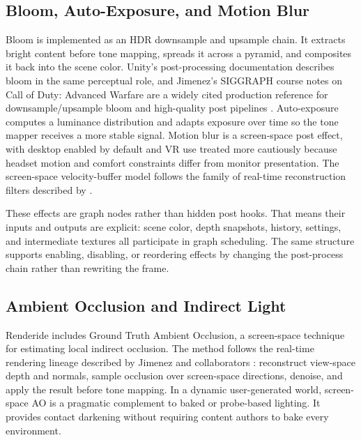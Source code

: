 \documentclass[acmtog,screen,nonacm]{acmart}
\begin{document}
\subsection{Bloom, Auto-Exposure, and Motion Blur}

Bloom is implemented as an HDR downsample and upsample chain. It extracts bright content before tone mapping, spreads it across a pyramid, and composites it back into the scene color. Unity's post-processing documentation describes bloom in the same perceptual role, and Jimenez's SIGGRAPH course notes on Call of Duty: Advanced Warfare are a widely cited production reference for downsample/upsample bloom and high-quality post pipelines \citep{unityPostProcessingBloom,jimenez2014postProcessing}. Auto-exposure computes a luminance distribution and adapts exposure over time so the tone mapper receives a more stable signal. Motion blur is a screen-space post effect, with desktop enabled by default and VR use treated more cautiously because headset motion and comfort constraints differ from monitor presentation. The screen-space velocity-buffer model follows the family of real-time reconstruction filters described by \citet{mcguire2012motionBlur}.

These effects are graph nodes rather than hidden post hooks. That means their inputs and outputs are explicit: scene color, depth snapshots, history, settings, and intermediate textures all participate in graph scheduling. The same structure supports enabling, disabling, or reordering effects by changing the post-process chain rather than rewriting the frame.

\subsection{Ambient Occlusion and Indirect Light}

Renderide includes Ground Truth Ambient Occlusion, a screen-space technique for estimating local indirect occlusion. The method follows the real-time rendering lineage described by Jimenez and collaborators \citep{jimenez2016gtao}: reconstruct view-space depth and normals, sample occlusion over screen-space directions, denoise, and apply the result before tone mapping. In a dynamic user-generated world, screen-space AO is a pragmatic complement to baked or probe-based lighting. It provides contact darkening without requiring content authors to bake every environment.
\end{document}
